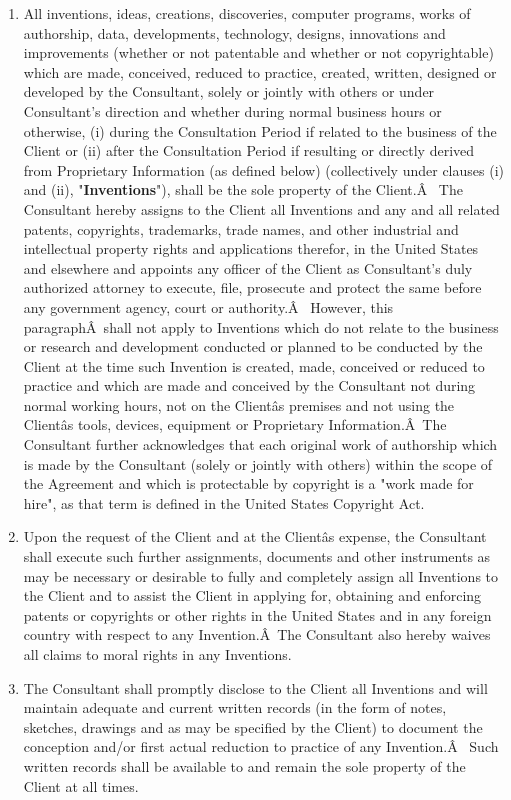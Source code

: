 \documentclass[12pt]{article}
\begin{document}
\begin{enumerate}
\begin{enumerate}
\begin{enumerate}[(1)]
            \item All inventions, ideas, creations, discoveries, computer programs, works of authorship, data, developments, technology, designs, innovations and improvements (whether or not patentable and whether or not copyrightable) which are made, conceived, reduced to practice, created, written, designed or developed by the Consultant, solely or jointly with others or under Consultant's direction and whether during normal business hours or otherwise, (i) during the Consultation Period if related to the business of the Client or (ii) after the Consultation Period if resulting or directly derived from Proprietary Information (as defined below) (collectively under clauses (i) and (ii), "{\bf Inventions}"), shall be the sole property of the Client.Â  The Consultant hereby assigns to the Client all Inventions and any and all related patents, copyrights, trademarks, trade names, and other industrial and intellectual property rights and applications therefor, in the United States and elsewhere and appoints any officer of the Client as Consultant's duly authorized attorney to execute, file, prosecute and protect the same before any government agency, court or authority.Â  However, this paragraphÂ shall not apply to Inventions which do not relate to the business or research and development conducted or planned to be conducted by the Client at the time such Invention is created, made, conceived or reduced to practice and which are made and conceived by the Consultant not during normal working hours, not on the Clientâs premises and not using the Clientâs tools, devices, equipment or Proprietary Information.Â The Consultant further acknowledges that each original work of authorship which is made by the Consultant (solely or jointly with others) within the scope of the Agreement and which is protectable by copyright is a "work made for hire", as that term is defined in the United States Copyright Act.
            \item Upon the request of the Client and at the Clientâs expense, the Consultant shall execute such further assignments, documents and other instruments as may be necessary or desirable to fully and completely assign all Inventions to the Client and to assist the Client in applying for, obtaining and enforcing patents or copyrights or other rights in the United States and in any foreign country with respect to any Invention.Â The Consultant also hereby waives all claims to moral rights in any Inventions.
            \item The Consultant shall promptly disclose to the Client all Inventions and will maintain adequate and current written records (in the form of notes, sketches, drawings and as may be specified by the Client) to document the conception and/or first actual reduction to practice of any Invention.Â  Such written records shall be available to and remain the sole property of the Client at all times.

\end{enumerate}
\end{enumerate}
\end{enumerate}
\end{document}
